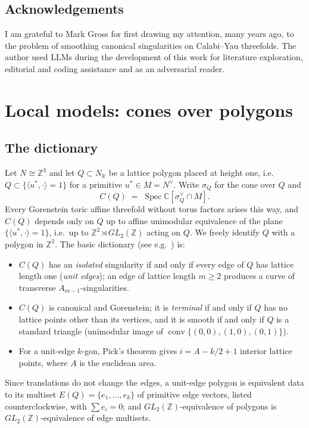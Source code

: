 \documentclass[11pt]{amsart}
\theoremstyle{definition}
\theoremstyle{remark}
\newcommand{\ZZ}{\mathbb{Z}}
\newcommand{\RR}{\mathbb{R}}
\newcommand{\CC}{\mathbb{C}}
\newcommand{\Spec}{\operatorname{Spec}}
\newcommand{\conv}{\operatorname{conv}}
\begin{document}
\subsection*{Acknowledgements}
I am grateful to Mark Gross for first drawing my attention, many years ago, to the problem of smoothing canonical singularities on Calabi--Yau threefolds.
The author used LLMs during the development of this work for literature exploration, editorial and coding assistance and as an adversarial reader.

\section{Local models: cones over polygons}\label{sec:local}

\subsection{The dictionary}
Let $N \cong \ZZ^3$ and let $Q \subset N_\RR$ be a lattice polygon placed at
height one, i.e.\ $Q \subset \{ \langle u^*, \cdot\rangle = 1\}$ for a
primitive $u^* \in M = N^\vee$.  Write $\sigma_Q$ for the cone over $Q$ and
\[
C(Q) \;=\; \Spec \CC[\sigma_Q^\vee \cap M].
\]
Every Gorenstein toric affine threefold without torus factors arises this way,
and $C(Q)$ depends only on $Q$ up to affine unimodular equivalence of the
plane $\{ \langle u^*,\cdot\rangle = 1\}$, i.e.\ up to $\ZZ^2 \rtimes
GL_2(\ZZ)$ acting on $Q$.  We freely identify $Q$ with a polygon in $\ZZ^2$.
The basic dictionary (see e.g.\ \cite{CFP}) is:
\begin{itemize}
\item $C(Q)$ has an \emph{isolated} singularity if and only if every edge of
$Q$ has lattice length one (\emph{unit edges}); an edge of lattice length
$m\ge 2$ produces a curve of transverse $A_{m-1}$-singularities.
\item $C(Q)$ is canonical and Gorenstein; it is \emph{terminal} if and only if
$Q$ has no lattice points other than its vertices, and it is smooth if and
only if $Q$ is a standard triangle (unimodular image of
$\conv\{(0,0),(1,0),(0,1)\}$).
\item For a unit-edge $k$-gon, Pick's theorem gives $i = A - k/2 + 1$ interior
lattice points, where $A$ is the euclidean area.
\end{itemize}
Since translations do not change the edges, a unit-edge polygon is equivalent
data to its multiset $E(Q)=\{e_1,\dots,e_k\}$ of primitive edge vectors,
listed counterclockwise, with $\sum e_i = 0$; and $GL_2(\ZZ)$-equivalence of
polygons is $GL_2(\ZZ)$-equivalence of edge multisets.
\end{document}
